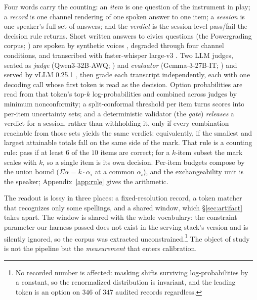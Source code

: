 \documentclass{article}
\newif\ifclaimtags\claimtagsfalse
\newcommand{\ct}[1]{\ifclaimtags\hfill{\scriptsize\textcolor{gray}{[#1]}}\fi}
\begin{document}
Four words carry the counting: an \emph{item} is one question of the
instrument in play; a \emph{record} is one channel rendering of
one spoken answer to one item; a \emph{session} is one speaker's full set of
answers; and the \emph{verdict} is the session-level pass/fail the decision rule
returns. Short written answers to civics questions (the Powergrading
corpus; \citealp{basu2013powergrading}) are spoken by synthetic voices
\citep{edgetts}, degraded through four channel conditions, and transcribed with
faster-whisper large-v3 \citep{fasterwhisper,radford2023whisper}. Two LLM judges, seated as \emph{judge} (Qwen3-32B-AWQ;
\citealp{qwen3report}) and \emph{evaluator} (Gemma-3-27B-IT;
\citealp{gemma3report}) and served by vLLM 0.25.1 \citep{kwon2023vllm}, then
grade each transcript independently, each with one decoding call whose first token is
read as the decision. Option probabilities are read from that token's
top-$k$ log-probabilities and combined across judges by minimum nonconformity; a
split-conformal threshold per item turns scores into per-item uncertainty sets;
and a deterministic validator (the \emph{gate}) \emph{releases} a verdict for a session, rather than withholding it, only if every combination
reachable from those sets yields the same verdict: equivalently, if the smallest and largest attainable totals fall on the same side
of the mark. That rule is a counting rule: pass if at least $6$ of the $10$ items
are correct; for a $k$-item subset the mark scales with $k$, so a single item is
its own decision. Per-item budgets compose by the union bound ($\Sigma\alpha = k\cdot\alpha_i$
at a common $\alpha_i$), and the exchangeability unit is the speaker;
Appendix~\ref{app:rule} gives the arithmetic.\ct{C38, C39, C41, C45}

The readout is lossy in three places: a fixed-resolution record, a token
matcher that recognizes only some spellings, and a shared window, which \S\ref{sec:artifact} takes apart. The window is shared with the whole
vocabulary: the constraint parameter our harness passed does not exist in the
serving stack's version and is silently ignored, so the corpus was extracted
unconstrained.\footnote{No recorded number is affected: masking shifts surviving
log-probabilities by a constant, so the renormalized distribution is invariant,
and the leading token is an option on $346$ of $347$ audited records
regardless.\ct{C64}}\ct{C62} The object of study is not the pipeline but the \emph{measurement} that
enters calibration.
\end{document}
